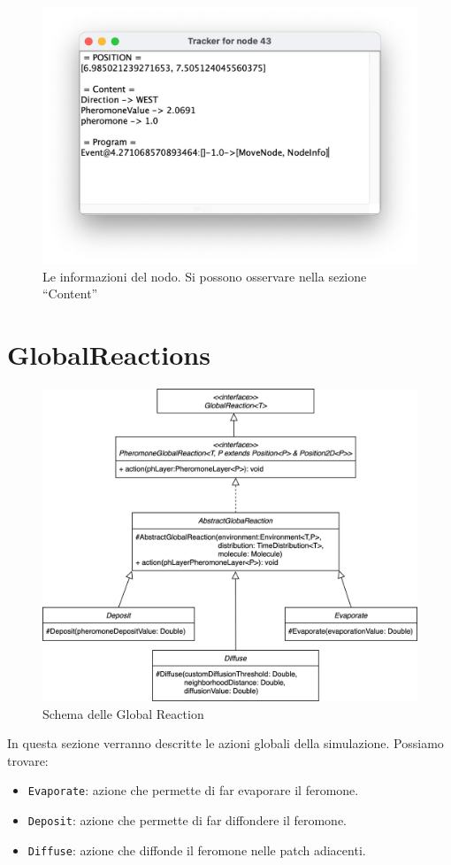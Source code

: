 \begin{figure}[ht]
    \centering
    \includegraphics[width=.7\linewidth]{figures/nodeinfo.jpg}
    \caption{Le informazioni del nodo. Si possono osservare nella sezione ``Content''}\label{fig:nodeinfo}
\end{figure}
\clearpage

\section{GlobalReactions}
\begin{figure}[ht]
    \centering
    \includegraphics[width=.7\linewidth]{figures/global.png}
    \caption{Schema delle Global Reaction }\label{fig:global}
\end{figure}
In questa sezione verranno descritte le azioni globali della simulazione. Possiamo trovare:
\begin{itemize}
    \item \texttt{Evaporate}: azione che permette di far evaporare il feromone.
    \item \texttt{Deposit}: azione che permette di far diffondere il feromone.
    \item \texttt{Diffuse}: azione che diffonde il feromone nelle patch adiacenti.
\end{itemize}
